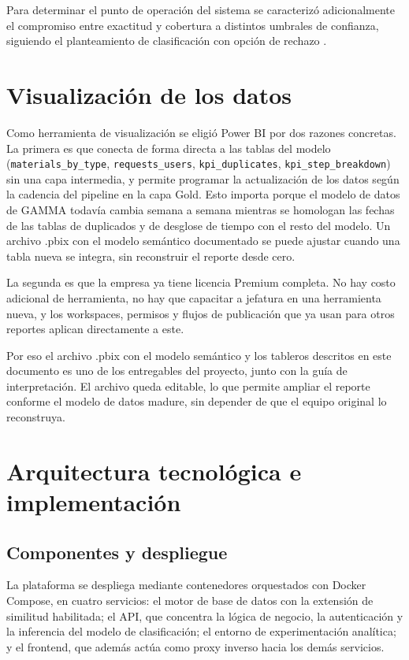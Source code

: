 Para determinar el punto de operación del sistema se caracterizó adicionalmente el compromiso entre exactitud y cobertura a distintos umbrales de confianza, siguiendo el planteamiento de clasificación con opción de rechazo \cite{chow1970}.

\section{Visualización de los datos}

Como herramienta de visualización se eligió Power BI por dos razones concretas. La primera es que conecta de forma directa a las tablas del modelo (\texttt{materials\_by\_type}, \texttt{requests\_users}, \texttt{kpi\_duplicates}, \texttt{kpi\_step\_breakdown}) sin una capa intermedia, y permite programar la actualización de los datos según la cadencia del pipeline en la capa Gold. Esto importa porque el modelo de datos de GAMMA todavía cambia semana a semana mientras se homologan las fechas de las tablas de duplicados y de desglose de tiempo con el resto del modelo. Un archivo .pbix con el modelo semántico documentado se puede ajustar cuando una tabla nueva se integra, sin reconstruir el reporte desde cero.

La segunda es que la empresa ya tiene licencia Premium completa. No hay costo adicional de herramienta, no hay que capacitar a jefatura en una herramienta nueva, y los workspaces, permisos y flujos de publicación que ya usan para otros reportes aplican directamente a este.

Por eso el archivo .pbix con el modelo semántico y los tableros descritos en este documento es uno de los entregables del proyecto, junto con la guía de interpretación. El archivo queda editable, lo que permite ampliar el reporte conforme el modelo de datos madure, sin depender de que el equipo original lo reconstruya.

\section{Arquitectura tecnológica e implementación}

\subsection{Componentes y despliegue}
La plataforma se despliega mediante contenedores orquestados con Docker Compose, en cuatro servicios: el motor de base de datos con la extensión de similitud habilitada; el API, que concentra la lógica de negocio, la autenticación y la inferencia del modelo de clasificación; el entorno de experimentación analítica; y el frontend, que además actúa como proxy inverso hacia los demás servicios.

